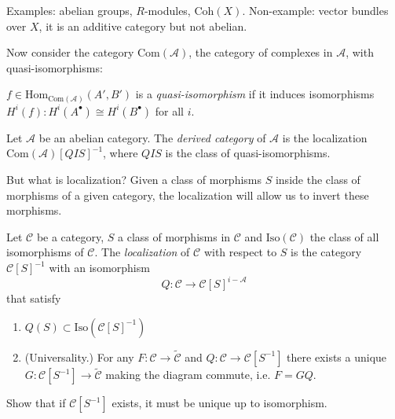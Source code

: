 Examples: abelian groups, $R$-modules, $\text{Coh}(X)$. Non-example: vector
bundles over $X$, it is an additive category but not abelian.

\medskip\noindent

Now consider the category $\text{Com}(\mathcal{A})$, the category of complexes
in $\mathcal{A}$, with quasi-isomorphisms:

\begin{definition}
\label{definition-quasi-isomorphism}
$f\in \text{Hom}_{\text{Com}(\mathcal{A})}(A',B')$ is a {\it quasi-isomorphism}
if it induces isomorphisms $H^i(f):H^i(A^{\bullet})\cong H^i(B^{\bullet})$ for
all $i$.
\end{definition}

\begin{definition}
\label{definition-derived-category}
Let $\mathcal{A}$ be an abelian category. The {\it derived category} of
$\mathcal{A}$ is the localization $\text{Com}(\mathcal{A})[QIS]^{-1}$, where
$QIS$ is the class of quasi-isomorphisms.
\end{definition}

But what is localization? Given a class of morphisms $S$ inside the class of
morphisms of a given category, the localization will allow us to invert these
morphisms.

\begin{definition}
\label{definition-localization-of-category}
Let $\mathcal{C}$ be a category, $S$ a class of morphisms in
$\mathcal{C}$ and $\text{Iso}(\mathcal{C})$ the class of all isomorphisms of
$\mathcal{C}$. The {\it localization} of $\mathcal{C}$ with respect to $S$ is
the category $\mathcal{C}[S]^{-1}$ with an isomorphism 
$$
Q:\mathcal{C}\to \mathcal{C}[S]^{i-\mathcal{A}}
$$
that satisfy
\begin{enumerate}
\item $Q(S) \subset \text{Iso}(\mathcal{C}[S]^{-1})$
\item (Universality.) For any $F:\mathcal{C}\to \tilde{\mathcal{C}}$ and
$Q:\mathcal{C}\to \mathcal{C}[S^{-1}]$ there exists a unique
$G:\mathcal{C}[S^{-1}]\to \tilde{ \mathcal{C}}$ making the diagram commute, i.e.
$F=GQ$.
\end{enumerate}
\end{definition}

\begin{exercise}
\label{exercise-uniqueness-of-localization}
Show that if $\mathcal{C}[S^{-1}]$ exists, it must be unique up to isomorphism.
\end{exercise}


